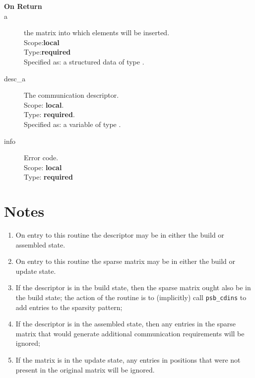 \begin{description}
\item[\bf On Return]
\item[a] the matrix into which elements will be inserted.\\
Scope:{\bf local}\\
Type:{\bf required}\\
Specified as: a structured data of type \spdata.
\item[desc\_a] The communication descriptor.\\
Scope: {\bf local}. \\
Type: {\bf required}.\\
Specified as: a variable of type \descdata.\\
\item[info] Error code.\\
Scope: {\bf local} \\
Type: {\bf required}\\
\end{description}

\section*{Notes}
\begin{enumerate}
\item On entry to this routine the descriptor may be in either the
  build or assembled state.
\item On entry to this routine the sparse matrix may be in either the
  build or update state. 
\item If the descriptor is in the build state, then the sparse matrix
  ought also be in the build state; the action of the routine is to
  (implicitly) call \verb|psb_cdins| to add entries to the sparsity
  pattern;
\item If the descriptor is in the assembled state, then any entries in
  the sparse matrix that would generate additional communication
  requirements will be ignored; 
\item If the matrix is in the update state, any entries in positions
  that were not present in the original matrix will be ignored. 
\end{enumerate}

%
%


